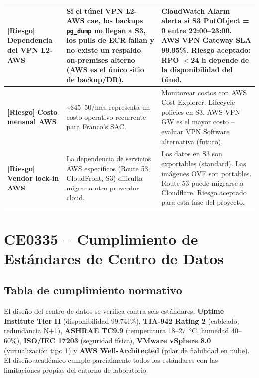 \documentclass[11pt, a4paper, oneside]{report}
\begin{document}
\begin{xltabular}{\textwidth}{@{}|L{2.8cm}|X|L{4cm}|@{}}
{\small \textcolor{sev_medio}{\textbf{[Riesgo]}} \textbf{Dependencia del VPN L2-AWS}} & {\small Si el túnel VPN L2-AWS cae, los backups \texttt{pg\_dump} no llegan a S3, los pulls de ECR fallan y no existe un respaldo on-premises alterno (AWS es el único sitio de backup/DR).} & {\small CloudWatch Alarm alerta si S3 PutObject = 0 entre 22:00--23:00. AWS VPN Gateway SLA 99.95\%. Riesgo aceptado: RPO $<$24 h depende de la disponibilidad del túnel.} \\ \hline

{\small \textcolor{sev_medio}{\textbf{[Riesgo]}} \textbf{Costo mensual AWS}} & {\small \textasciitilde\$45--50/mes representa un costo operativo recurrente para Franco's SAC.} & {\small Monitorear costos con AWS Cost Explorer. Lifecycle policies en S3. AWS VPN GW es el mayor costo -- evaluar VPN Software alternativa (futuro).} \\ \hline

{\small \textcolor{sev_critico}{\textbf{[Riesgo]}} \textbf{Vendor lock-in AWS}} & {\small La dependencia de servicios AWS específicos (Route 53, CloudFront, S3) dificulta migrar a otro proveedor cloud.} & {\small Los datos en S3 son exportables (standard). Las imágenes OVF son portables. Route 53 puede migrarse a Cloudflare. Riesgo aceptado para esta fase del proyecto.} \\ \hline

\end{xltabular}
\normalsize

\chapter{CE0335 -- Cumplimiento de Estándares de Centro de Datos}


\section{Tabla de cumplimiento normativo}

El diseño del centro de datos se verifica contra seis estándares: \textbf{Uptime Institute Tier II} (disponibilidad 99.741\%), \textbf{TIA-942 Rating 2} (cableado, redundancia N+1), \textbf{ASHRAE TC9.9} (temperatura 18--27~°C, humedad 40--60\%), \textbf{ISO/IEC 17203} (seguridad física), \textbf{VMware vSphere 8.0} (virtualización tipo 1) y \textbf{AWS Well-Architected} (pilar de fiabilidad en nube). El diseño académico cumple parcialmente todos los estándares con las limitaciones propias del entorno de laboratorio.
\end{document}

